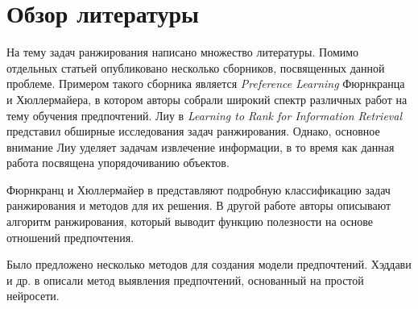 \chapter{Обзор литературы}
\label{chapter:literature}

На тему задач ранжирования написано множество литературы. Помимо отдельных статьей опубликовано несколько сборников, посвященных данной проблеме. Примером такого сборника является \textit{Preference Learning} \cite{plbook:2010} Фюрнкранца и Хюллермайера, в котором авторы собрали широкий спектр различных работ на тему обучения предпочтений. Лиу в \textit{Learning to Rank for Information Retrieval} \cite{Liu:2011} представил обширные исследования задач ранжирования. Однако, основное внимание Лиу уделяет задачам извлечение информации, в то время как данная работа посвящена упорядочиванию объектов.

Фюрнкранц и Хюллермайер в \cite{plbook:Introduction:2010} представляют подробную классификацию задач ранжирования и методов для их решения. В другой работе \cite{Furnkranz:2003} авторы описывают алгоритм ранжирования, который выводит функцию полезности на основе отношений предпочтения.

Было предложено несколько методов для создания модели предпочтений. Хэддави и др. в \cite{Haddawy:2003} описали метод выявления предпочтений, основанный на простой нейросети. 